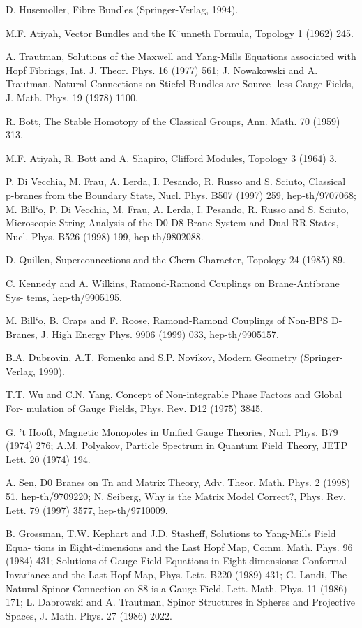 \documentclass[11pt,a4paper]{ctexart}
\begin{document}
\begin{enumerate}[label={[\arabic*]},leftmargin=*,itemsep=2pt]
\item D. Husemoller, Fibre Bundles (Springer-Verlag, 1994).
\item M.F. Atiyah, Vector Bundles and the K¨unneth Formula, Topology 1 (1962) 245.
\item A. Trautman, Solutions of the Maxwell and Yang-Mills Equations associated with Hopf Fibrings, Int. J. Theor. Phys. 16 (1977) 561; J. Nowakowski and A. Trautman, Natural Connections on Stiefel Bundles are Source- less Gauge Fields, J. Math. Phys. 19 (1978) 1100.
\item R. Bott, The Stable Homotopy of the Classical Groups, Ann. Math. 70 (1959) 313.
\item M.F. Atiyah, R. Bott and A. Shapiro, Clifford Modules, Topology 3 (1964) 3.
\item P. Di Vecchia, M. Frau, A. Lerda, I. Pesando, R. Russo and S. Sciuto, Classical p-branes from the Boundary State, Nucl. Phys. B507 (1997) 259, hep-th/9707068; M. Bill`o, P. Di Vecchia, M. Frau, A. Lerda, I. Pesando, R. Russo and S. Sciuto, Microscopic String Analysis of the D0-D8 Brane System and Dual RR States, Nucl. Phys. B526 (1998) 199, hep-th/9802088.
\item D. Quillen, Superconnections and the Chern Character, Topology 24 (1985) 89.
\item C. Kennedy and A. Wilkins, Ramond-Ramond Couplings on Brane-Antibrane Sys- tems, hep-th/9905195.
\item M. Bill`o, B. Craps and F. Roose, Ramond-Ramond Couplings of Non-BPS D-Branes, J. High Energy Phys. 9906 (1999) 033, hep-th/9905157.
\item B.A. Dubrovin, A.T. Fomenko and S.P. Novikov, Modern Geometry (Springer-Verlag, 1990).
\item T.T. Wu and C.N. Yang, Concept of Non-integrable Phase Factors and Global For- mulation of Gauge Fields, Phys. Rev. D12 (1975) 3845.
\item G. ’t Hooft, Magnetic Monopoles in Unified Gauge Theories, Nucl. Phys. B79 (1974) 276; A.M. Polyakov, Particle Spectrum in Quantum Field Theory, JETP Lett. 20 (1974) 194.
\item A. Sen, D0 Branes on Tn and Matrix Theory, Adv. Theor. Math. Phys. 2 (1998) 51, hep-th/9709220; N. Seiberg, Why is the Matrix Model Correct?, Phys. Rev. Lett. 79 (1997) 3577, hep-th/9710009.
\item B. Grossman, T.W. Kephart and J.D. Stasheff, Solutions to Yang-Mills Field Equa- tions in Eight-dimensions and the Last Hopf Map, Comm. Math. Phys. 96 (1984) 431; Solutions of Gauge Field Equations in Eight-dimensions: Conformal Invariance and the Last Hopf Map, Phys. Lett. B220 (1989) 431; G. Landi, The Natural Spinor Connection on S8 is a Gauge Field, Lett. Math. Phys. 11 (1986) 171; L. Dabrowski and A. Trautman, Spinor Structures in Spheres and Projective Spaces, J. Math. Phys. 27 (1986) 2022.

\end{enumerate}
\end{document}
